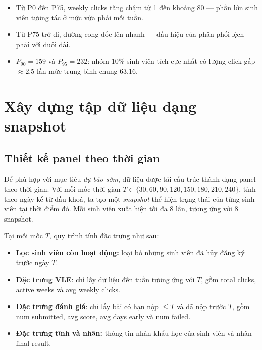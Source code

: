 \documentclass[a4paper]{report}
\newcommand{\code}[1]{{\ttfamily\def\_{\textunderscore\discretionary{}{}{}}#1}}
\def\code#1{#1}%
\def\_{ }%
\begin{document}
\begin{itemize}[leftmargin=*]
  \item Từ P0 đến P75, \code{weekly\_clicks} tăng chậm từ 1 đến khoảng 80 ---
        phần lớn sinh viên tương tác ở mức vừa phải mỗi tuần.
  \item Từ P75 trở đi, đường cong dốc lên nhanh --- dấu hiệu của phân phối lệch
        phải với đuôi dài.
  \item $P_{90} = 159$ và $P_{95} = 232$: nhóm 10\% sinh viên tích cực nhất có
        lượng click gấp $\approx 2.5$ lần mức trung bình chung 63.16.
\end{itemize}

\section{Xây dựng tập dữ liệu dạng snapshot}

\subsection{Thiết kế panel theo thời gian}
\label{sec:panel_design}

Để phù hợp với mục tiêu \textit{dự báo sớm}, dữ liệu được tái cấu trúc thành
dạng panel theo thời gian. Với mỗi mốc thời gian
$T \in \{30, 60, 90, 120, 150, 180, 210, 240\}$, tính theo ngày kể từ đầu khoá,
ta tạo
một \textit{snapshot} thể hiện trạng thái của từng sinh viên tại thời điểm đó.
Mỗi sinh viên xuất hiện tối đa 8 lần, tương ứng với 8 snapshot.

Tại mỗi mốc $T$, quy trình tính đặc trưng như sau:

\begin{itemize}[leftmargin=*]
  \item \textbf{Lọc sinh viên còn hoạt động:} loại bỏ những sinh viên đã hủy
        đăng ký trước ngày $T$.
  \item \textbf{Đặc trưng VLE}: chỉ lấy dữ liệu đến tuần tương ứng với $T$,
        gồm \code{total\_clicks}, \code{active\_weeks} và
        \code{avg\_weekly\_clicks}.
  \item \textbf{Đặc trưng đánh giá}: chỉ lấy bài có hạn nộp $\le T$ và đã nộp
        trước $T$, gồm \code{num\_submitted}, \code{avg\_score},
        \code{avg\_days\_early} và \code{num\_failed}.
  \item \textbf{Đặc trưng tĩnh và nhãn:} thông tin nhân khẩu học của sinh viên
        và nhãn \code{final\_result}.
\end{itemize}
\end{document}
